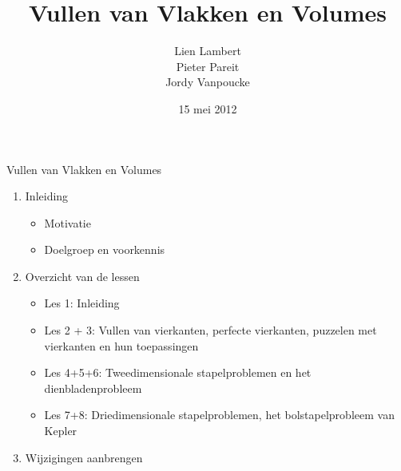 \documentclass[dutch]{beamer}
\title[Vullen van Vlakken en Volumes]{Vullen van Vlakken en Volumes}
\author[Lien Lambert \& Pieter Pareit \& Jordy Vanpoucke ]{Lien Lambert \\Pieter Pareit \\Jordy Vanpoucke}
\date{\tiny 15 mei 2012}
\begin{document}
\frame{
\titlepage}

\begin{frame}{Vullen van Vlakken en Volumes}

\begin{enumerate}
	\item Inleiding
	  \begin{itemize}
	    \item Motivatie
	    \item Doelgroep en voorkennis
    \end{itemize}
  \item Overzicht van de lessen
    \begin{itemize}
	    \item Les 1: Inleiding
	    \item Les 2 + 3: Vullen van vierkanten, perfecte vierkanten, puzzelen met vierkanten en hun toepassingen
	    \item Les 4+5+6: Tweedimensionale stapelproblemen en het dienbladenprobleem
	    \item Les 7+8: Driedimensionale stapelproblemen, het bolstapelprobleem van Kepler
    \end{itemize}
  \item Wijzigingen aanbrengen
\end{enumerate}
\end{frame}
\end{document}

